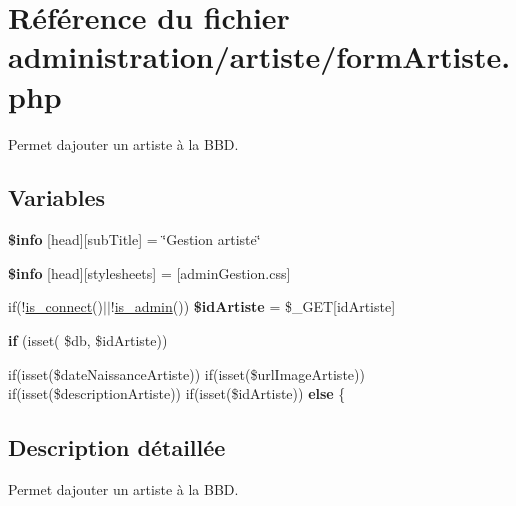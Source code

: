 \hypertarget{formArtiste_8php}{}\section{Référence du fichier administration/artiste/form\+Artiste.php}
\label{formArtiste_8php}


Permet d\textquotesingle{}ajouter un artiste à la B\+BD.  


\subsection*{Variables}
\begin{DoxyCompactItemize}
\item 
\mbox{\label{formArtiste_8php_a024f87f9bf4f3b33710e2e7ff8f60823}} 
{\bfseries \$info} \mbox{[}\textquotesingle{}head\textquotesingle{}\mbox{]}\mbox{[}\textquotesingle{}sub\+Title\textquotesingle{}\mbox{]} = \char`\"{}Gestion artiste\char`\"{}
\item 
\mbox{\label{formArtiste_8php_af6044c8bf78ebc8c58057e14d7738bbd}} 
{\bfseries \$info} \mbox{[}\textquotesingle{}head\textquotesingle{}\mbox{]}\mbox{[}\textquotesingle{}stylesheets\textquotesingle{}\mbox{]} = \mbox{[}\textquotesingle{}admin\+Gestion.\+css\textquotesingle{}\mbox{]}
\item 
\mbox{\label{formArtiste_8php_a78e32fe1474580ab3e2b0ec16401d846}} 
if(!\hyperlink{fonctionCompte_8php_a2fe594e0482307b8729ea37780d6f74b}{is\+\_\+connect}()$\vert$$\vert$!\hyperlink{fonctionCompte_8php_a0b327581800dba50ad70720e23ae2ed2}{is\+\_\+admin}()) {\bfseries \$id\+Artiste} = \$\+\_\+\+G\+ET\mbox{[}\textquotesingle{}id\+Artiste\textquotesingle{}\mbox{]}
\item 
\mbox{\label{formArtiste_8php_a6a396995f6e1bf68b2c2276e280fa76c}} 
{\bfseries if} (isset( \$db, \$id\+Artiste))
\item 
\mbox{\label{formArtiste_8php_afc408af374e5e06cd3fe6e7eb7a3efef}} 
if(isset(\$date\+Naissance\+Artiste)) if(isset(\$url\+Image\+Artiste)) if(isset(\$description\+Artiste)) if(isset(\$id\+Artiste)) {\bfseries else} \{
\end{DoxyCompactItemize}


\subsection{Description détaillée}
Permet d\textquotesingle{}ajouter un artiste à la B\+BD. 

